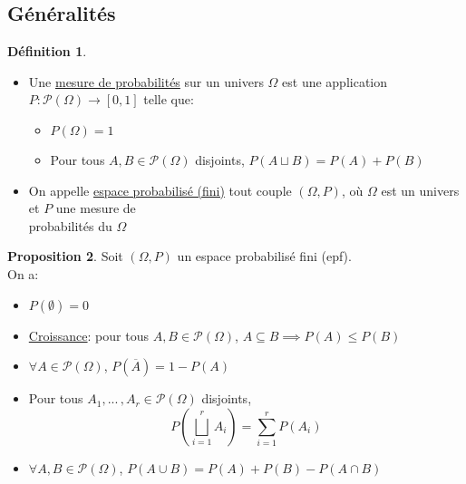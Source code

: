 \documentclass[10pt,a4paper]{article}
\theoremstyle{definition}
\newtheorem{proposition}{Proposition}[section]
\newtheorem{definition}[proposition]{Définition}
\begin{document}
\subsection{Généralités}
\begin{definition}
\hfill
\begin{itemize}
\item Une \uline{mesure de probabilités} sur un univers $\Omega$ est une application $P: \mathcal{P}(\Omega) \to [0, 1]$ telle que:
\begin{itemize}
\item $P(\Omega) = 1$
\item Pour tous $A, B \in \mathcal{P}(\Omega)$ disjoints, $P(A \sqcup B) = P(A) + P(B)$
\end{itemize}
\item On appelle \uline{espace probabilisé (fini)} tout couple $(\Omega, P)$, où $\Omega$ est un univers et $P$ une mesure de \\
probabilités du $\Omega$
\end{itemize}
\end{definition}
\begin{proposition}
Soit $(\Omega, P)$ un espace probabilisé fini (epf). \\
On a:
\begin{itemize}
\item $P(\emptyset) = 0$
\item \uline{Croissance}: pour tous $A, B \in \mathcal{P}(\Omega)$, $A \subseteq B \implies P(A) \leq P(B)$
\item $\forall A \in \mathcal{P}(\Omega)$, $P(\overline{A}) = 1 - P(A)$
\item Pour tous $A_1, ...\,, A_r \in \mathcal{P}(\Omega)$ disjoints, \[P\left( \bigsqcup\limits_{i = 1}^r A_i \right) = \sum\limits_{i = 1}^r P(A_i)\]
\item $\forall A, B \in \mathcal{P}(\Omega)$, $P(A \cup B) = P(A) + P(B) - P(A \cap B)$
\end{itemize}
\end{proposition}

\pagebreak
\end{document}
